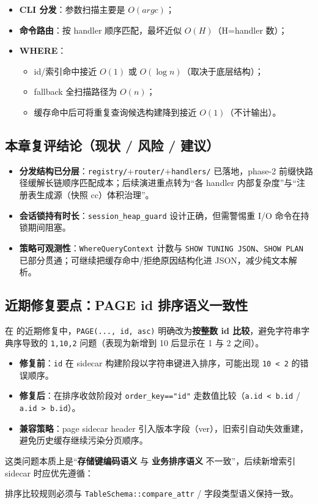\begin{itemize}
  \item \textbf{CLI 分发}：参数扫描主要是 \(O(argc)\)；
  \item \textbf{命令路由}：按 handler 顺序匹配，最坏近似 \(O(H)\)（H=handler 数）；
  \item \textbf{WHERE}：
    \begin{itemize}
      \item id/索引命中接近 \(O(1)\) 或 \(O(\log n)\)（取决于底层结构）；
      \item fallback 全扫描路径为 \(O(n)\)；
      \item 缓存命中后可将重复查询候选构建降到接近 \(O(1)\)（不计输出）。
    \end{itemize}
\end{itemize}

\subsection{本章复评结论（现状 / 风险 / 建议）}

\begin{itemize}
  \item \textbf{分发结构已分层}：\texttt{registry/}+\texttt{router/}+\texttt{handlers/} 已落地，phase-2 前缀快路径缓解长链顺序匹配成本；后续演进重点转为“各 handler 内部复杂度”与“注册表生成源（快照 cc）体积治理”。
  \item \textbf{会话锁持有时长}：\texttt{session\_heap\_guard} 设计正确，但需警惕重 I/O 命令在持锁期间阻塞。
  \item \textbf{策略可观测性}：\texttt{WhereQueryContext} 计数与 \texttt{SHOW TUNING JSON}、\texttt{SHOW PLAN} 已部分贯通；可继续把缓存命中/拒绝原因结构化进 JSON，减少纯文本解析。
\end{itemize}

\subsection{近期修复要点：PAGE id 排序语义一致性}

在  的近期修复中，\texttt{PAGE(..., id, asc)} 明确改为\textbf{按整数 id 比较}，避免字符串字典序导致的
\texttt{1,10,2} 问题（表现为新增到 10 后显示在 1 与 2 之间）。

\begin{itemize}
  \item \textbf{修复前}：\texttt{id} 在 sidecar 构建阶段以字符串键进入排序，可能出现 \texttt{10 < 2} 的错误顺序。
  \item \textbf{修复后}：在排序收敛阶段对 \texttt{order\_key=="id"} 走数值比较（\texttt{a.id < b.id} / \texttt{a.id > b.id}）。
  \item \textbf{兼容策略}：page sidecar header 引入版本字段（ver），旧索引自动失效重建，避免历史缓存继续污染分页顺序。
\end{itemize}

这类问题本质上是“\textbf{存储键编码语义} 与 \textbf{业务排序语义} 不一致”，后续新增索引 sidecar 时应优先遵循：
\begin{center}
排序比较规则必须与 \texttt{TableSchema::compare\_attr} / 字段类型语义保持一致。
\end{center}

